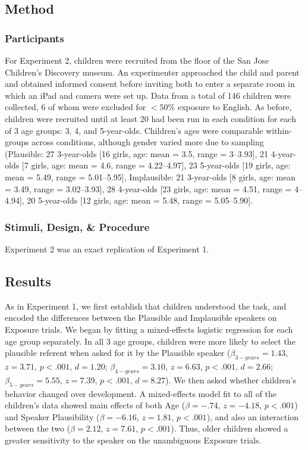 \documentclass[man,floatsintext]{apa6}
\begin{document}
\subsection{Method}

\subsubsection{Participants}

For Experiment 2, children were recruited from the floor of the San Jose Children's Discovery museum. An experimenter approached the child and parent and obtained informed consent before inviting both to enter a separate room in which an iPad and camera were set up. Data from a total of 146 children were collected, 6 of whom were excluded for $<50\%$ exposure to English. As before, children were recruited until at least 20 had been run in each condition for each of 3 age groups: 3, 4, and 5-year-olds. Children's ages were comparable within-groups across conditions, although gender varied more due to sampling (Plausible: 27 3-year-olds [16 girls, age: mean = 3.5, range = 3--3.93], 21 4-year-olds [7 girls, age: mean = 4.6, range = 4.22--4.97], 23 5-year-olds [19 girls, age: mean = 5.49, range = 5.01--5.95], Implausible: 21 3-year-olds [8 girls, age: mean = 3.49, range = 3.02--3.93], 28 4-year-olds [23 girls, age: mean = 4.51, range = 4--4.94], 20 5-year-olds [12 girls, age: mean = 5.48, range = 5.05--5.90].


\subsubsection{Stimuli, Design, \& Procedure}

Experiment 2 was an exact replication of Experiment 1.

\subsection{Results}

As in Experiment 1, we first establish that children understood the task, and encoded the differences between the Plausible and Implausible speakers on Exposure trials. We began by fitting a mixed-effects logistic regression for each age group separately. In all 3 age groups, children were more likely to select the plausible referent when asked for it by the Plausible speaker ($\beta_{3-years} = 1.43$, $z = 3.71$, $p < .001$, $d = 1.20$; $\beta_{4-years} = 3.10$, $z = 6.63$, $p < .001$, $d = 2.66$; $\beta_{5-years} = 5.55$, $z = 7.39$, $p < .001$, $d = 8.27$). We then asked whether children's behavior changed over development. A mixed-effects model fit to all of the children's data showed main effects of both Age ($\beta = -.74$, $z = -4.18$, $p < .001$) and Speaker Plausibility ($\beta = -6.16$, $z = 1.81$, $p < .001$), and also an interaction between the two ($\beta = 2.12$, $z = 7.61$, $p < .001$). Thus, older children showed a greater sensitivity to the speaker on the unambiguous Exposure trials.
\end{document}
